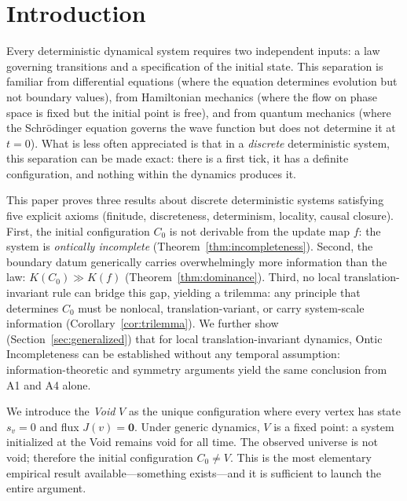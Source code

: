 \documentclass[12pt]{article}
\theoremstyle{plain}
\theoremstyle{definition}
\theoremstyle{remark}
\begin{document}
\section{Introduction}

Every deterministic dynamical system requires two independent inputs: a law governing transitions and a specification of the initial state. This separation is familiar from differential equations (where the equation determines evolution but not boundary values), from Hamiltonian mechanics (where the flow on phase space is fixed but the initial point is free), and from quantum mechanics (where the Schr\"odinger equation governs the wave function but does not determine it at $t = 0$). What is less often appreciated is that in a \emph{discrete} deterministic system, this separation can be made exact: there is a first tick, it has a definite configuration, and nothing within the dynamics produces it.

This paper proves three results about discrete deterministic systems satisfying five explicit axioms (finitude, discreteness, determinism, locality, causal closure). First, the initial configuration $C_0$ is not derivable from the update map $f$: the system is \emph{ontically incomplete} (Theorem~\ref{thm:incompleteness}). Second, the boundary datum generically carries overwhelmingly more information than the law: $K(C_0) \gg K(f)$ (Theorem~\ref{thm:dominance}). Third, no local translation-invariant rule can bridge this gap, yielding a trilemma: any principle that determines $C_0$ must be nonlocal, translation-variant, or carry system-scale information (Corollary~\ref{cor:trilemma}). We further show (Section~\ref{sec:generalized}) that for local translation-invariant dynamics, Ontic Incompleteness can be established without any temporal assumption: information-theoretic and symmetry arguments yield the same conclusion from A1 and A4 alone.

We introduce the \emph{Void} $V$ as the unique configuration where every vertex has state $s_v = 0$ and flux $J(v) = \mathbf{0}$. Under generic dynamics, $V$ is a fixed point: a system initialized at the Void remains void for all time. The observed universe is not void; therefore the initial configuration $C_0 \neq V$. This is the most elementary empirical result available---something exists---and it is sufficient to launch the entire argument.
\end{document}
